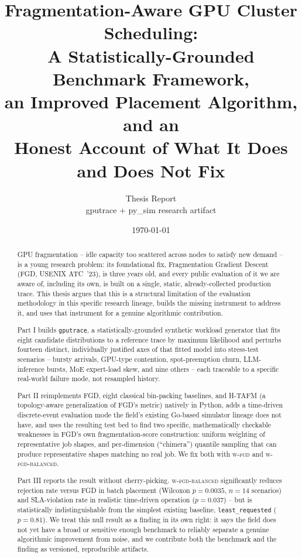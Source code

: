\documentclass[12pt]{report}
\title{
\vspace{-1.5cm}
\Huge\textbf{Fragmentation-Aware GPU Cluster Scheduling:\\[4pt]
A Statistically-Grounded Benchmark Framework,\\[4pt]
an Improved Placement Algorithm, and an\\[4pt]
Honest Account of What It Does and Does Not Fix}
\vspace{1cm}
}
\author{Thesis Report\\[4pt]\normalsize gputrace + py\_sim research artifact}
\date{\normalsize\today}
\begin{document}
\maketitle

\begin{abstract}
\onehalfspacing
GPU fragmentation -- idle capacity too scattered across nodes to satisfy
new demand -- is a young research problem: its foundational fix,
Fragmentation Gradient Descent (FGD, USENIX ATC~'23), is three years old,
and every public evaluation of it we are aware of, including its own, is
built on a single, static, already-collected production trace. This
thesis argues that this is a structural limitation of the evaluation
methodology in this specific research lineage, builds the missing
instrument to address it, and uses that instrument for a genuine
algorithmic contribution.

Part I builds \texttt{gputrace}, a statistically-grounded synthetic
workload generator that fits eight candidate distributions to a reference
trace by maximum likelihood and perturbs fourteen distinct, individually
justified axes of that fitted model into stress-test scenarios --
bursty arrivals, GPU-type contention, spot-preemption churn,
LLM-inference bursts, MoE expert-load skew, and nine others -- each
traceable to a specific real-world failure mode, not resampled history.

Part II reimplements FGD, eight classical bin-packing baselines, and
H-TAFM (a topology-aware generalization of FGD's metric) natively in
Python, adds a time-driven discrete-event evaluation mode the field's
existing Go-based simulator lineage does not have, and uses the resulting
test bed to find two specific, mathematically checkable weaknesses in
FGD's own fragmentation-score construction: uniform weighting of
representative job shapes, and per-dimension (``chimera'') quantile
sampling that can produce representative shapes matching no real job.
We fix both with \textsc{w-fgd} and \textsc{w-fgd-balanced}.

Part III reports the result without cherry-picking. \textsc{w-fgd-balanced}
significantly reduces rejection rate versus FGD in batch placement
(Wilcoxon $p=0.0035$, $n=14$ scenarios) and SLA-violation rate in
realistic time-driven operation ($p=0.037$) -- but is statistically
indistinguishable from the simplest existing baseline,
\texttt{least\_requested} ($p=0.81$). We treat this null result as a
finding in its own right: it says the field does not yet have a broad or
sensitive enough benchmark to reliably separate a genuine algorithmic
improvement from noise, and we contribute both the benchmark and the
finding as versioned, reproducible artifacts.
\end{abstract}
\end{document}

